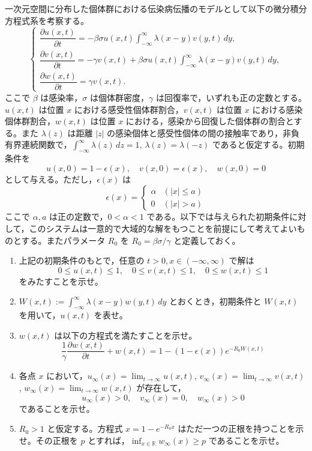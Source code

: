 \documentclass[12pt]{jlreq}
\newcommand{\R}{\mathbb{R}}
\begin{document}
一次元空間に分布した個体群における伝染病伝播のモデルとして以下の微分積分方程式系を考察する。
\[
  \begin{cases} \dfrac{\partial u(x,t)}{\partial t} = -\beta\sigma u(x,t) \int_{-\infty}^\infty \lambda(x-y)v(y,t) \, dy, \\ \dfrac{\partial v(x,t)}{\partial t} = -\gamma v(x,t) + \beta\sigma u(x,t) \int_{-\infty}^\infty \lambda(x-y)v(y,t) \, dy, \\ \dfrac{\partial w(x,t)}{\partial t} = \gamma v(x,t). \end{cases}
\]
ここで $\beta$ は感染率，$\sigma$ は個体群密度，$\gamma$ は回復率で，いずれも正の定数とする。$u(x,t)$ は位置 $x$ における感受性個体群割合，$v(x,t)$ は位置 $x$ における感染個体群割合，$w(x,t)$ は位置 $x$ における，感染から回復した個体群の割合とする。また $\lambda(z)$ は距離 $|z|$ の感染個体と感受性個体の間の接触率であり，非負有界連続関数で，$\int_{-\infty}^\infty \lambda(z) \, dz = 1$, $\lambda(z) = \lambda(-z)$ であると仮定する。初期条件を
\[
  u(x,0) = 1 - \epsilon(x),\quad v(x,0) = \epsilon(x),\quad w(x,0) = 0
\]
として与える。ただし，$\epsilon(x)$ は
\[
  \epsilon(x) = \begin{cases} \alpha & (|x| \le a) \\ 0 & (|x| > a) \end{cases}
\]
ここで $\alpha, a$ は正の定数で，$0 < \alpha < 1$ である。以下では与えられた初期条件に対して，このシステムは一意的で大域的な解をもつことを前提にして考えてよいものとする。またパラメータ $R_0$ を $R_0 = \beta\sigma/\gamma$ と定義しておく。

\begin{enumerate}
  \item 上記の初期条件のもとで，任意の $t > 0, x \in (-\infty,\infty)$ で解は
  \[
    0 \le u(x,t) \le 1,\quad 0 \le v(x,t) \le 1,\quad 0 \le w(x,t) \le 1
  \]
  をみたすことを示せ。
  \item $W(x,t) := \int_{-\infty}^\infty \lambda(x-y)w(y,t) \, dy$ とおくとき，初期条件と $W(x,t)$ を用いて，$u(x,t)$ を表せ。
  \item $w(x,t)$ は以下の方程式を満たすことを示せ。
  \[
    \frac{1}{\gamma} \frac{\partial w(x,t)}{\partial t} + w(x,t) = 1 - (1-\epsilon(x))e^{-R_0 W(x,t)}
  \]
  \item 各点 $x$ において，$u_\infty(x) = \lim_{t\to\infty} u(x,t)$, $v_\infty(x) = \lim_{t\to\infty} v(x,t)$, $w_\infty(x) = \lim_{t\to\infty} w(x,t)$ が存在して，
  \[
    u_\infty(x) > 0,\quad v_\infty(x) = 0,\quad w_\infty(x) > 0
  \]
  であることを示せ。
  \item $R_0 > 1$ と仮定する。方程式 $x = 1 - e^{-R_0 x}$ はただ一つの正根を持つことを示せ。その正根を $p$ とすれば，$\inf_{x \in \R} w_\infty(x) \ge p$ であることを示せ。
\end{enumerate}
\end{document}
